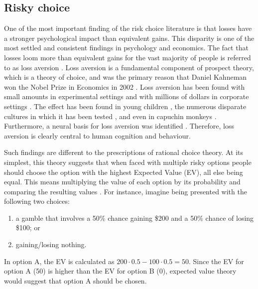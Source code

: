 \documentclass[a4paper, nobind, dvipsnames]{templates/ociamthesis}
\providecommand{\tightlist}{%
  \setlength{\itemsep}{0pt}\setlength{\parskip}{0pt}}
\theoremstyle{definition}
\theoremstyle{definition}
\theoremstyle{definition}
\theoremstyle{definition}
\theoremstyle{remark}
\begin{document}
\subsection{Risky choice}

One of the most important finding of the risk choice literature is that losses
have a stronger psychological impact than equivalent gains. This disparity is
one of the most settled and consistent findings in psychology and economics. The
fact that losses loom more than equivalent gains for the vast majority of people
is referred to as loss aversion \autocite{kahneman1979}. Loss aversion is a fundamental
component of prospect theory, which is a theory of choice, and was the primary
reason that Daniel Kahneman won the Nobel Prize in Economics in 2002
\autocite{kahneman2003}. Loss aversion has been found with small amounts in experimental
settings \autocite{kahneman1979,tversky1992} and with millions of dollars in corporate
settings \autocite{koller2012,swalm1966}. The effect has been found in young children
\autocite{harbaugh2001}, the numerous disparate cultures in which it has been tested
\autocite{weber1998}, and even in capuchin monkeys \autocite{chen2006a}. Furthermore, a neural
basis for loss aversion was identified \autocite{tom2007}. Therefore, loss aversion is
clearly central to human cognition and behaviour.

Such findings are different to the prescriptions of rational choice theory. At
its simplest, this theory suggests that when faced with multiple risky options
people should choose the option with the highest Expected Value (EV), all else
being equal. This means multiplying the value of each option by its probability
and comparing the resulting values \autocite[first documented in][]{pascal1999}. For
instance, imagine being presented with the following two choices:

\begin{enumerate}
\def\labelenumi{\Alph{enumi})}
\tightlist
\item
  a gamble that involves a 50\% chance gaining \$200 and a 50\% chance of losing
  \$100; or
\item
  gaining/losing nothing.
\end{enumerate}

In option A, the EV is calculated as \(200 \cdot 0.5 - 100 \cdot 0.5 = 50\). Since
the EV for option A (50) is higher than the EV for option B (0), expected value
theory would suggest that option A should be chosen.
\end{document}
